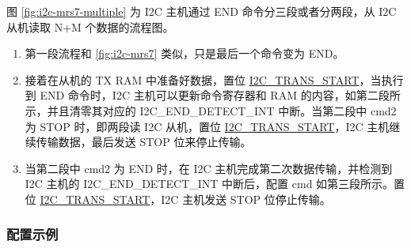 \documentclass[main\_\_CN.tex]{subfiles}
\begin{document}
图 \ref{fig:i2c-mrs7-multiple} 为 I2C 主机通过 END 命令分三段或者分两段，从 I2C 从机读取 N+M 个数据的流程图。

\begin{enumerate}
    \item 第一段流程和 \ref{fig:i2c-mrs7} 类似，只是最后一个命令变为 END。
    \item 接着在从机的 TX RAM 中准备好数据，置位 \hyperref[fielddesc:I2CTRANSSTART]{I2C\_TRANS\_START}，当执行到 END 命令时，I2C 主机可以更新命令寄存器和 RAM 的内容，如第二段所示，并且清零其对应的 I2C\_END\_DETECT\_INT 中断。当第二段中 cmd2 为 STOP 时，即两段读 I2C 从机，置位 \hyperref[fielddesc:I2CTRANSSTART]{I2C\_TRANS\_START}，I2C 主机继续传输数据，最后发送 STOP 位来停止传输。
    \item 当第二段中 cmd2 为 END 时，在 I2C 主机完成第二次数据传输，并检测到 I2C 主机的 I2C\_END\_DETECT\_INT 中断后，配置 cmd 如第三段所示。置位 \hyperref[fielddesc:I2CTRANSSTART]{I2C\_TRANS\_START}，I2C 主机发送 STOP 位停止传输。
\end{enumerate}

\subsubsection{配置示例}
\end{document}
